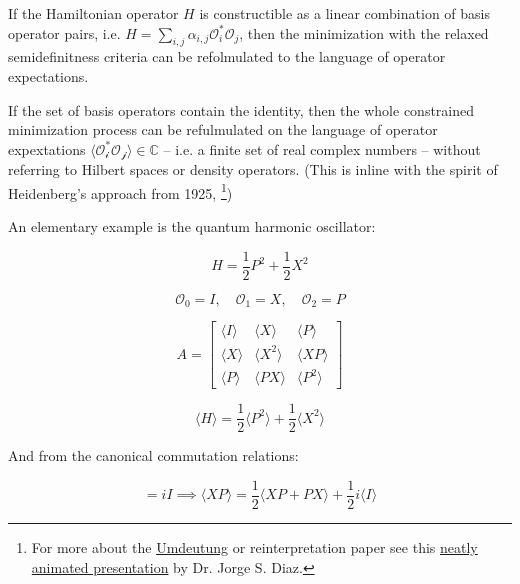 \documentclass{article}
\theoremstyle{definition}
\begin{document}
If the Hamiltonian operator $H$ is constructible as a linear combination of basis operator pairs, i.e. $H=\sum_{i,j} \alpha_{i,j} \mathcal{O}^*_i \mathcal{O}_j$, then the minimization with the relaxed semidefinitness criteria can be refolmulated to the language of operator expectations.

If the set of basis operators contain the identity, then the whole constrained minimization process can be refulmulated on the language of operator expextations $\langle\mathcal{O^*_i \mathcal{O}_j}\rangle \in \mathbb{C}$ -- i.e. a finite set of real complex numbers -- without referring to Hilbert spaces or density operators.
(This is inline with the spirit of Heidenberg's approach from 1925, \cite{paper:EnglishTranslationHeisenberg1925,book:VanDerWaerden1968,paper:Heisenberg1925}\footnote{For more about the \href{https://en.wikipedia.org/wiki/Umdeutung_paper}{Umdeutung} or reinterpretation paper see this \href{https://www.youtube.com/watch?v=oVzzIkkYGY8}{neatly animated presentation} by Dr. Jorge S. Diaz.})

An elementary example is the quantum harmonic oscillator:

\begin{equation}
    H=\frac{1}{2} P^2+ \frac{1}{2} X^2
\end{equation}

\begin{equation}
    \mathcal{O_0}=I, \quad \mathcal{O}_1=X, \quad \mathcal{O}_2 = P
\end{equation}

\begin{equation}
    A=
    \begin{bmatrix}
        \langle I \rangle & \langle X \rangle & \langle P \rangle \\
        \langle X \rangle & \langle X^2 \rangle & \langle XP \rangle \\
        \langle P \rangle & \langle PX \rangle & \langle P^2 \rangle
    \end{bmatrix}
\end{equation}

\begin{equation}
    \langle H \rangle = \frac{1}{2} \langle P^2 \rangle + \frac{1}{2} \langle X^2 \rangle
\end{equation}

And from the canonical commutation relations:

\begin{equation}
    [X,P] = i I
    \implies
    \langle XP \rangle = \frac{1}{2} \langle X P+PX \rangle + \frac{1}{2} i \langle I \rangle
\end{equation}
\end{document}
